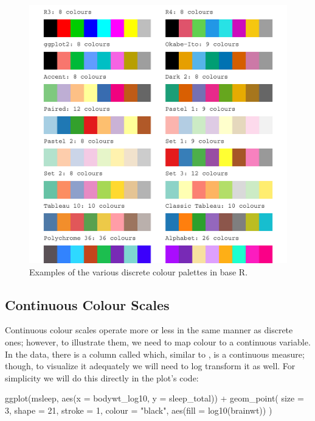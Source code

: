 \begin{figure}[h]
\centering
\includegraphics[scale = .6]{graphics/ch2Figs/palettes.pdf}
\caption{Examples of the various discrete colour palettes in base R.}
\label{fig:discrete_cols}
\end{figure}

\subsection{Continuous Colour Scales}

Continuous colour scales operate more or less in the same manner as discrete ones; however, to illustrate them, we need to map colour to a continuous variable. In the  data, there is a column called  which, similar to , is a continuous measure; though, to visualize it adequately we will need to log transform it as well. For simplicity we will do this directly in the plot's code:

\begin{inR}
ggplot(msleep, aes(x = bodywt_log10, y = sleep_total)) +
  geom_point(
    size = 3, shape = 21, stroke = 1, colour = "black",
    aes(fill = log10(brainwt))
  )
\end{inR}

\vspace{2em}

